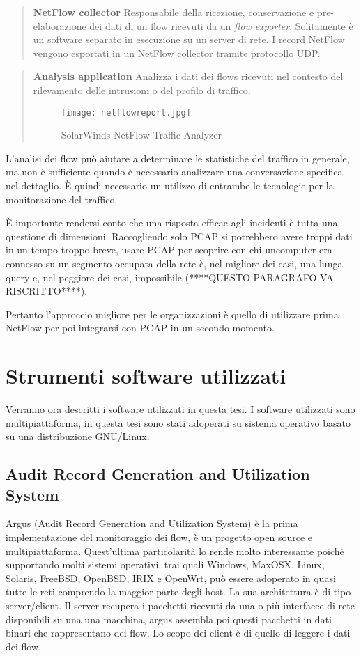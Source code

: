 \documentclass[../main.tex]{subfiles}
\begin{document}
\begin{verse}
\textbf{NetFlow collector}
Responsabile della ricezione, conservazione e pre-elaborazione dei dati di un flow ricevuti da un \textit{flow exporter}. Solitamente è un software separato in esecuzione su un server di rete. I record NetFlow vengono esportati in un NetFlow collector tramite protocollo UDP.
\end{verse}

\begin{verse}
\textbf{Analysis application} 
Analizza i dati dei flows ricevuti nel contesto del rilevamento delle intrusioni o del profilo di traffico.

\begin{figure}[H]
\centering
\texttt{[image: netflowreport.jpg]}
\caption{SolarWinds NetFlow Traffic Analyzer}
\end{figure}
\end{verse}


L'analisi dei flow può aiutare a determinare le statistiche del traffico in generale, ma non è sufficiente quando è necessario analizzare una conversazione specifica nel dettaglio. È quindi necessario un utilizzo di entrambe le tecnologie per la monitorazione del traffico.

È importante rendersi conto che una risposta efficae agli incidenti è tutta una questione di dimensioni. Raccogliendo solo PCAP si potrebbero avere troppi dati in un tempo troppo breve, usare PCAP per scoprire con chi uncomputer era connesso su un segmento occupata della rete è, nel migliore dei casi, una lunga query e, nel peggiore dei casi, impossibile (****QUESTO PARAGRAFO VA RISCRITTO****).

Pertanto l'approccio migliore per le organizzazioni è quello di utilizzare prima NetFlow per poi integrarsi con PCAP in un secondo momento.

\section{Strumenti software utilizzati}
Verranno ora descritti i software utilizzati in questa tesi. I software utilizzati sono multipiattaforma, in questa tesi sono stati adoperati su sistema operativo basato su una distribuzione GNU/Linux.

\subsection{Audit Record Generation and Utilization System}
Argus (Audit Record Generation and Utilization System) è la prima implementazione del monitoraggio dei flow, è un progetto open source e multipiattaforma.
Quest'ultima particolarità lo rende molto interessante poichè supportando molti sistemi operativi, trai quali Windows, MaxOSX, Linux, Solaris, FreeBSD, OpenBSD, IRIX e OpenWrt, può essere adoperato in quasi tutte le reti comprendo la maggior parte degli host. La sua architettura è di tipo server/client. Il server recupera i pacchetti ricevuti da una o più interfacce di rete disponibili su una una macchina, argus assembla poi questi pacchetti in dati binari che rappresentano dei flow. Lo scopo dei client è di quello di leggere i dati dei flow. \newline
\end{document}
